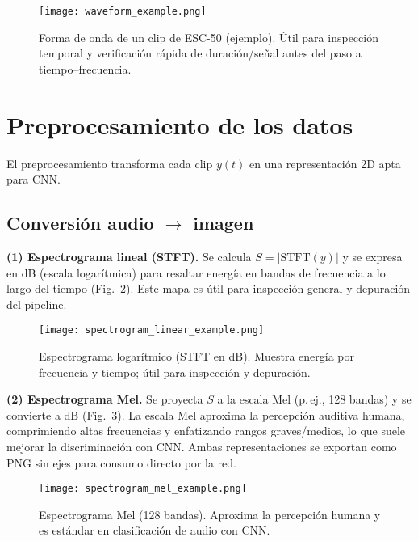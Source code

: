 \documentclass[conference]{IEEEtran}
\begin{document}
\begin{figure}[H]
    \centering
    \texttt{[image: waveform\_example.png]}
    \caption{Forma de onda de un clip de ESC-50 (ejemplo). Útil para inspección temporal y verificación rápida de duración/señal antes del paso a tiempo--frecuencia.}
    \label{fig:wave}
\end{figure}

\section{Preprocesamiento de los datos }
El preprocesamiento transforma cada clip $y(t)$ en una representación 2D apta para CNN.

\subsection{Conversión audio $\rightarrow$ imagen}
\textbf{(1) Espectrograma lineal (STFT).} Se calcula $S=\lvert\text{STFT}(y)\rvert$ y se expresa en dB (escala logarítmica) para resaltar energía en bandas de frecuencia a lo largo del tiempo (Fig.~\ref{fig:stft}). Este mapa es útil para inspección general y depuración del pipeline.

\begin{figure}[H]
    \centering
    \texttt{[image: spectrogram\_linear\_example.png]}
    \caption{Espectrograma logarítmico (STFT en dB). Muestra energía por frecuencia y tiempo; útil para inspección y depuración.}
    \label{fig:stft}
\end{figure}

\textbf{(2) Espectrograma Mel.} Se proyecta $S$ a la escala Mel (p.\,ej., 128 bandas) y se convierte a dB (Fig.~\ref{fig:mel}). La escala Mel aproxima la percepción auditiva humana, comprimiendo altas frecuencias y enfatizando rangos graves/medios, lo que suele mejorar la discriminación con CNN. Ambas representaciones se exportan como PNG sin ejes para consumo directo por la red.

\begin{figure}[H]
    \centering
    \texttt{[image: spectrogram\_mel\_example.png]}
    \caption{Espectrograma Mel (128 bandas). Aproxima la percepción humana y es estándar en clasificación de audio con CNN.}
    \label{fig:mel}
\end{figure}
\end{document}
